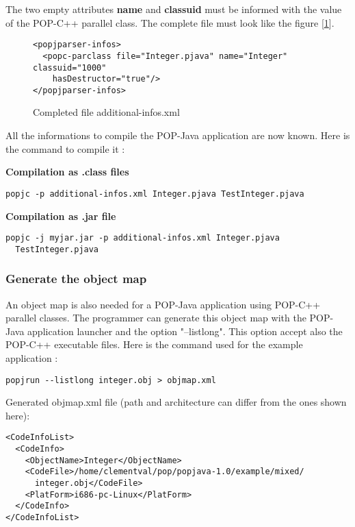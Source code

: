 The two empty attributes \textbf{name} and \textbf{classuid} must be informed with the value of the POP-C++ parallel class. The complete file must look like the figure [\ref{fig:complete_add_info_xml}].

\begin{figure}[ht]
	\caption{Completed file additional-infos.xml}
	\label{fig:complete_add_info_xml}
\begin{lstlisting}
<popjparser-infos>
  <popc-parclass file="Integer.pjava" name="Integer" classuid="1000" 
    hasDestructor="true"/>
</popjparser-infos>
\end{lstlisting}
\end{figure}

All the informations to compile the POP-Java application are now known. Here is the command to compile it : \s

\textbf{Compilation as .class files}
\begin{lstlisting}
popjc -p additional-infos.xml Integer.pjava TestInteger.pjava
\end{lstlisting}\s

\textbf{Compilation as .jar file}
\begin{lstlisting}
popjc -j myjar.jar -p additional-infos.xml Integer.pjava 
  TestInteger.pjava
\end{lstlisting}

\subsubsection{Generate the object map}
An object map is also needed for a POP-Java application using POP-C++ parallel classes. The programmer can generate this object map with the POP-Java application launcher and the option "--listlong". This option accept also the POP-C++ executable files. Here is the command used for the example application : 

\begin{lstlisting}
popjrun --listlong integer.obj > objmap.xml
\end{lstlisting}\s

\pagebreak
Generated objmap.xml file (path and architecture can differ from the ones shown here): 
\begin{lstlisting}
<CodeInfoList>
  <CodeInfo>
    <ObjectName>Integer</ObjectName>
    <CodeFile>/home/clementval/pop/popjava-1.0/example/mixed/
      integer.obj</CodeFile>
    <PlatForm>i686-pc-Linux</PlatForm>
  </CodeInfo>
</CodeInfoList>
\end{lstlisting}

